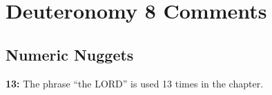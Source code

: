 \section{Deuteronomy 8 Comments}

\subsection{Numeric Nuggets}
\textbf{13: } The phrase ``the LORD'' is used 13 times in the chapter.